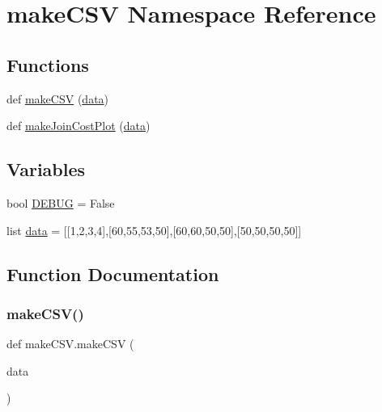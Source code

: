\hypertarget{namespacemake_c_s_v}{}\section{make\+C\+SV Namespace Reference}
\label{namespacemake_c_s_v}
\subsection*{Functions}
\begin{DoxyCompactItemize}
\item 
def \mbox{\hyperlink{namespacemake_c_s_v_a2e31859af1f2b66e9bb8e3a5193cd01e}{make\+C\+SV}} (\mbox{\hyperlink{namespacemake_c_s_v_a018aaab493af92ea83348b0db6e32328}{data}})
\item 
def \mbox{\hyperlink{namespacemake_c_s_v_aae06ec5a9c945ceb7cf58ed6874d6ed8}{make\+Join\+Cost\+Plot}} (\mbox{\hyperlink{namespacemake_c_s_v_a018aaab493af92ea83348b0db6e32328}{data}})
\end{DoxyCompactItemize}
\subsection*{Variables}
\begin{DoxyCompactItemize}
\item 
bool \mbox{\hyperlink{namespacemake_c_s_v_a117352cc494cc62c6b2f1882786a332c}{D\+E\+B\+UG}} = False
\item 
list \mbox{\hyperlink{namespacemake_c_s_v_a018aaab493af92ea83348b0db6e32328}{data}} = \mbox{[}\mbox{[}1,2,3,4\mbox{]},\mbox{[}60,55,53,50\mbox{]},\mbox{[}60,60,50,50\mbox{]},\mbox{[}50,50,50,50\mbox{]}\mbox{]}
\end{DoxyCompactItemize}


\subsection{Function Documentation}
\mbox{\label{namespacemake_c_s_v_a2e31859af1f2b66e9bb8e3a5193cd01e}} 
\subsubsection{\texorpdfstring{makeCSV()}{makeCSV()}}
{\footnotesize\ttfamily def make\+C\+S\+V.\+make\+C\+SV (\begin{DoxyParamCaption}\item[{}]{data }\end{DoxyParamCaption})}

